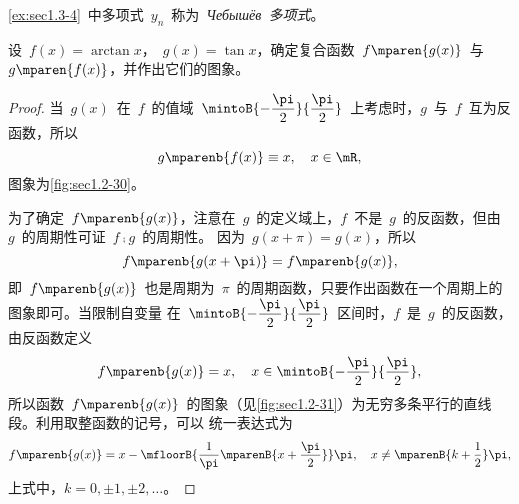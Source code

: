 \ref{ex:sec1.3-4}~中多项式~$y_n$~称为~\emph{Чебышёв~多项式}。

\begin{example}
设~$f(x)=\arctan x$，~$g(x)=\tan x$，确定复合函数~$f\mparen{g(x)}$~与~$g\mparen{f(x)}$，并作出它们的图象。
\end{example}
\begin{proof}
当~$g(x)$~在~$f$~的值域~$\mintoB{-\dfrac\pi2}{\dfrac\pi2}$~上考虑时，$g$~与~$f$~互为反函数，所以
\[
  g\mparenb{f(x)}\equiv x\mcond*{x\in\mR},
\]
图象为\ref{fig:sec1.2-30}。

\begin{figure}
\begin{floatrow}[2]
\figurebox{\caption{}\label{fig:sec1.2-30}}
          {\somefigure}
\figurebox{\caption{}\label{fig:sec1.2-31}}
          {\somefigure}
\end{floatrow}
\end{figure}

为了确定~$f\mparenb{g(x)}$，注意在~$g$~的定义域上，$f$~不是~$g$~的反函数，但由~$g$~的周期性可证~$f\comp g$~的周期性。%
因为~$g(x+\pi)=g(x)$，所以
\[
  f\mparenb{g(x+\pi)}=f\mparenb{g(x)},
\]
即~$f\mparenb{g(x)}$~也是周期为~$\pi$~的周期函数，只要作出函数在一个周期上的图象即可。当限制自变量
在~$\mintoB{-\dfrac\pi2}{\dfrac\pi2}$~区间时，$f$~是~$g$~的反函数，由反函数定义
\[
  f\mparenb{g(x)}=x\mcond*{x\in\mintoB{-\dfrac\pi2}{\dfrac\pi2}},
\]
所以函数~$f\mparenb{g(x)}$~的图象（见\ref{fig:sec1.2-31}）为无穷多条平行的直线段。利用取整函数的记号，可以
统一表达式为
\[
f\mparenb{g(x)}=x-\mfloorB{\frac1\pi\mparenB{x+\frac\pi2}}\pi\mcond*{x\neq\mparenB{k+\frac12}\pi},
\]
上式中，$k=0,\pm1,\pm2,\dotsc$。
\end{proof}


